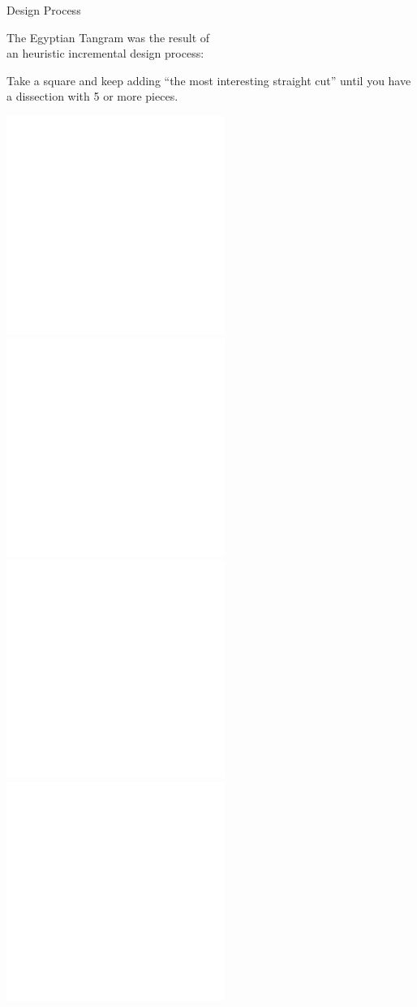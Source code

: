 \documentclass[14pt]{beamer}
\begin{document}

    \begin{frame}{Design Process}
        \begin{center}
            The Egyptian Tangram was the result of\\an heuristic incremental design process: 

            \bigskip

            {\small Take a square and keep adding ``the most interesting straight cut'' until you have a dissection with 5 or more pieces.}

            \bigskip \bigskip

        
            \includegraphics[height=10ex]{figures/figure001e.pdf} \quad \includegraphics[height=10ex]{figures/figure001d.pdf} \quad \includegraphics[height=10ex]{figures/figure001c.pdf} \quad \includegraphics[height=10ex]{figures/figure001b.pdf} \\
        \end{center}
    \end{frame}

\end{document}

